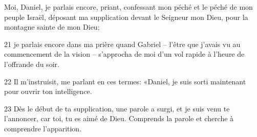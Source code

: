 Moi, Daniel, je parlais encore, priant, confessant mon péché et le péché de mon peuple Israël, déposant ma supplication devant le Seigneur mon Dieu, pour la montagne sainte de mon Dieu;

21 je parlais encore dans ma prière quand Gabriel – l’être que j’avais vu au commencement de la vision – s’approcha de moi d’un vol rapide à l’heure de l’offrande du soir.

22 Il m’instruisit, me parlant en ces termes: «Daniel, je suis sorti maintenant pour ouvrir ton intelligence.

23 Dès le début de ta supplication, une parole a surgi, et je suis venu te l’annoncer, car toi, tu es aimé de Dieu. Comprends la parole et cherche à comprendre l’apparition.

